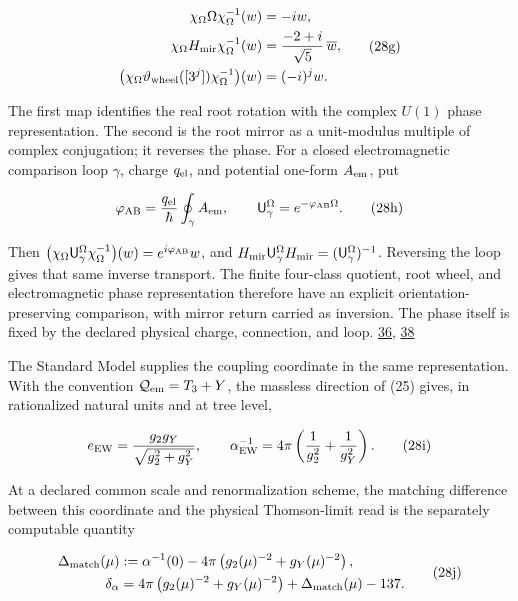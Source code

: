 \[
\begin{aligned}
\chi_\Omega\Omega\chi_\Omega^{-1}(w)&=-iw,\\
\chi_\Omega H_{\rm mir}\chi_\Omega^{-1}(w)
&=\frac{-2+i}{\sqrt5}\,\overline w,\\
\bigl(\chi_\Omega\vartheta_{\rm wheel}([3^j])\chi_\Omega^{-1}\bigr)(w)
&=(-i)^j w.
\end{aligned}
\tag{28g}
\]

The first map identifies the real root rotation with the complex \(U(1)\) phase representation. The second is the root mirror as a unit-modulus multiple of complex conjugation; it reverses the phase. For a closed electromagnetic comparison loop \(\gamma\), charge \(q_{\rm el}\), and potential one-form \(A_{\rm em}\), put

\[
\varphi_{\rm AB}=\frac{q_{\rm el}}{\hbar}\oint_\gamma A_{\rm em},
\qquad
\mathsf U^\Omega_\gamma=e^{-\varphi_{\rm AB}\Omega}.
\tag{28h}
\]

Then \(\bigl(\chi_\Omega\mathsf U^\Omega_\gamma\chi_\Omega^{-1}\bigr)(w)=e^{i\varphi_{\rm AB}}w\), and \(H_{\rm mir}\mathsf U^\Omega_\gamma H_{\rm mir}=(\mathsf U^\Omega_\gamma)^{-1}\). Reversing the loop gives that same inverse transport. The finite four-class quotient, root wheel, and electromagnetic phase representation therefore have an explicit orientation-preserving comparison, with mirror return carried as inversion. The phase itself is fixed by the declared physical charge, connection, and loop. \href{https://chatgpt.com/library?file_id=libfile_c8b01c25977c8191821c6dddbe16e0da\&account_id=personal}{36}, \href{https://doi.org/10.1103/PhysRev.115.485}{38}

The Standard Model supplies the coupling coordinate in the same representation. With the convention \(\mathcal Q_{\rm em}=T_3+Y\), the massless direction of (25) gives, in rationalized natural units and at tree level,

\[
e_{\rm EW}=\frac{g_2g_Y}{\sqrt{g_2^2+g_Y^2}},
\qquad
\alpha_{\rm EW}^{-1}
=4\pi\left(\frac1{g_2^2}+\frac1{g_Y^2}\right).
\tag{28i}
\]

At a declared common scale and renormalization scheme, the matching difference between this coordinate and the physical Thomson-limit read is the separately computable quantity

\[
\begin{aligned}
\Delta_{\rm match}(\mu)&:=\alpha^{-1}(0)
-4\pi\left(g_2(\mu)^{-2}+g_Y(\mu)^{-2}\right),\\
\delta_\alpha&=4\pi\left(g_2(\mu)^{-2}+g_Y(\mu)^{-2}\right)
+\Delta_{\rm match}(\mu)-137.
\end{aligned}
\tag{28j}
\]

